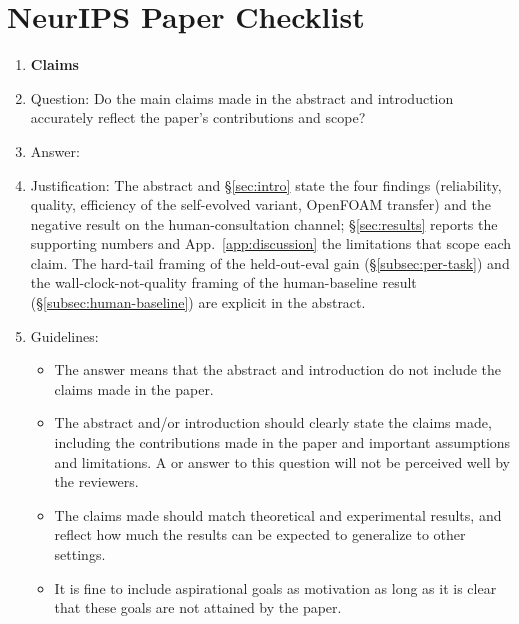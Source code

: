 \section*{NeurIPS Paper Checklist}


\begin{enumerate}

\item {\bf Claims}
    \item[] Question: Do the main claims made in the abstract and introduction accurately reflect the paper's contributions and scope?
    \item[] Answer: \answerYes{}
    \item[] Justification: The abstract and \S\ref{sec:intro} state the four findings (reliability, quality, efficiency of the self-evolved variant, OpenFOAM transfer) and the negative result on the human-consultation channel; \S\ref{sec:results} reports the supporting numbers and App.~\ref{app:discussion} the limitations that scope each claim. The hard-tail framing of the held-out-eval gain (\S\ref{subsec:per-task}) and the wall-clock-not-quality framing of the human-baseline result (\S\ref{subsec:human-baseline}) are explicit in the abstract.
    \item[] Guidelines:
    \begin{itemize}
        \item The answer \answerNA{} means that the abstract and introduction do not include the claims made in the paper.
        \item The abstract and/or introduction should clearly state the claims made, including the contributions made in the paper and important assumptions and limitations. A \answerNo{} or \answerNA{} answer to this question will not be perceived well by the reviewers.
        \item The claims made should match theoretical and experimental results, and reflect how much the results can be expected to generalize to other settings.
        \item It is fine to include aspirational goals as motivation as long as it is clear that these goals are not attained by the paper.
    \end{itemize}


\end{enumerate}
